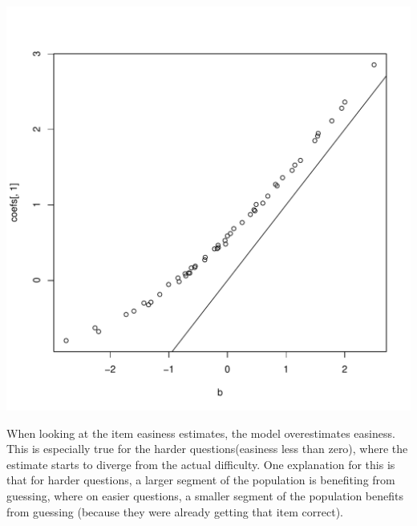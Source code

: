 \documentclass{article}\usepackage[]{graphicx}\usepackage[]{color}
\makeatletter
\def\maxwidth{ %
  \ifdim\Gin@nat@width>\linewidth
    \linewidth
  \else
    \Gin@nat@width
  \fi
}
\newenvironment{knitrout}{}{} %
\makeatother
\begin{document}
\begin{knitrout}
\color{fgcolor}
\includegraphics[width=\maxwidth]{figure/unnamed-chunk-10-1} 

\end{knitrout}

When looking at the item easiness estimates, the model overestimates easiness.  This is especially true for the harder questions(easiness less than zero), where the estimate starts to diverge from the actual difficulty.  One explanation for this is that for harder questions, a larger segment of the population is benefiting from guessing, where on easier questions, a smaller segment of the population benefits from guessing (because they were already getting that item correct).
\end{document}
